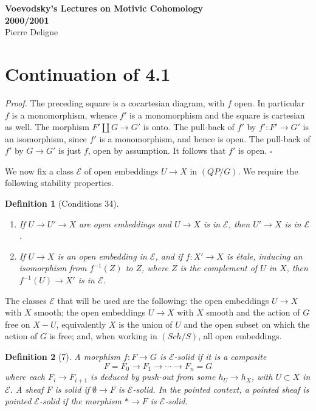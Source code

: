 \documentclass[11pt]{article}
\newcommand{\pt}{*}
\theoremstyle{deligne}
\newtheorem*{definition*}{Definition}
\newenvironment{proofdel}{\noindent\textit{Proof.}}{\hfill$\square$}
\begin{document}
\begin{center}
{\Large\bfseries Voevodsky's Lectures on Motivic Cohomology\\
2000/2001}\\[0.5em]
{\large Pierre Deligne}
\end{center}

\section*{Continuation of 4.1}

\begin{proofdel}
The preceding square is a cocartesian diagram, with \(f\) open. In particular \(f\) is a monomorphism, whence \(f'\) is a monomorphism and the square is cartesian as well. The morphism \(F'\amalg G\to G'\) is onto. The pull-back of \(f'\) by \(f':F'\to G'\) is an isomorphism, since \(f'\) is a monomorphism, and hence is open. The pull-back of \(f'\) by \(G\to G'\) is just \(f\), open by assumption. It follows that \(f'\) is open.
\end{proofdel}

We now fix a class \(\mathcal E\) of open embeddings \(U\to X\) in \((QP/G)\). We require the following stability properties.

\begin{definition*}[Conditions 34]
\begin{enumerate}[label=\arabic*.]
\item If \(U\to U'\to X\) are open embeddings and \(U\to X\) is in \(\mathcal E\), then \(U'\to X\) is in \(\mathcal E\).
\item If \(U\to X\) is an open embedding in \(\mathcal E\), and if \(f:X'\to X\) is étale, inducing an isomorphism from \(f^{-1}(Z)\) to \(Z\), where \(Z\) is the complement of \(U\) in \(X\), then \(f^{-1}(U)\to X'\) is in \(\mathcal E\).
\end{enumerate}
\end{definition*}

The classes \(\mathcal E\) that will be used are the following: the open embeddings \(U\to X\) with \(X\) smooth; the open embeddings \(U\to X\) with \(X\) smooth and the action of \(G\) free on \(X-U\), equivalently \(X\) is the union of \(U\) and the open subset on which the action of \(G\) is free; and, when working in \((Sch/S)\), all open embeddings.

\begin{definition*}[7]
A morphism \(f:F\to G\) is \(\mathcal E\)-solid if it is a composite
\[
F=F_0\longrightarrow F_1\longrightarrow \cdots\longrightarrow F_n=G
\]
where each \(F_i\to F_{i+1}\) is deduced by push-out from some \(h_U\to h_X\), with \(U\subset X\) in \(\mathcal E\). A sheaf \(F\) is solid if \(\emptyset\to F\) is \(\mathcal E\)-solid. In the pointed context, a pointed sheaf is pointed \(\mathcal E\)-solid if the morphism \(\pt\to F\) is \(\mathcal E\)-solid.
\end{definition*}
\end{document}
